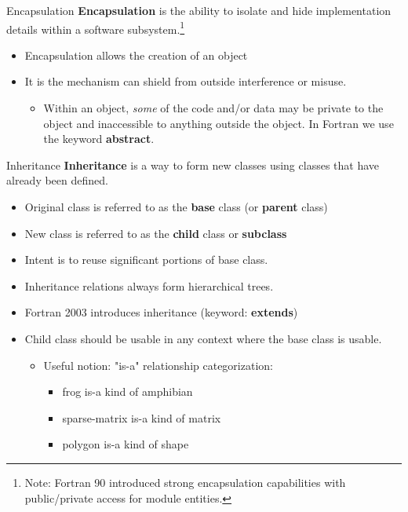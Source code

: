 \documentclass[11pt]{beamer}
\newcommand{\bi}{\begin{itemize}}
\newcommand{\ei}{\end{itemize}}
\begin{document}

\begin{frame}[fragile]{Encapsulation}
\textbf{Encapsulation} is the ability to isolate and hide implementation details within a software subsystem.\footnote{Note: Fortran 90 introduced strong encapsulation capabilities with public/private access for module entities.}
\bi
\item Encapsulation allows the creation of an object
\item It is the mechanism can shield from outside interference or misuse. 
\bi
\item Within an object, \emph{some} of the code and/or data may be private to the object and inaccessible to anything outside the object. In Fortran we use the keyword \textbf{abstract}.
\ei
\ei

\end{frame}


\begin{frame}{Inheritance}
\textbf{Inheritance} is a way to form new classes using classes that have already been defined.
\begin{itemize}

  \item Original class is referred to as the \textbf{base} class (or \textbf{parent} class)
  \item New class is referred to as the \textbf{child} class or \textbf{subclass}
  \item Intent is to reuse significant portions of base class.
  \item Inheritance relations always form hierarchical trees.
  \item Fortran 2003 introduces inheritance (keyword: \textbf{extends})
  \item Child class should be usable in any context where the base class is usable.
  \begin{itemize}
  \item Useful notion: "is-a" relationship categorization:
    \begin{itemize}
    \item frog is-a kind of amphibian
    \item sparse-matrix is-a kind of matrix
    \item polygon is-a kind of shape
    \end{itemize}
  \end{itemize}
  
 \end{itemize}

\end{frame}
\end{document}
